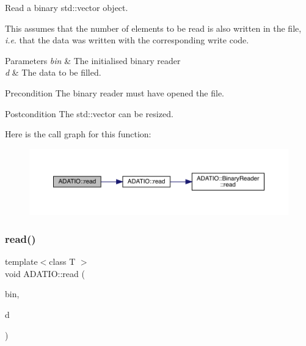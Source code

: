 Read a binary std\+::vector object. 

This assumes that the number of elements to be read is also written in the file, {\itshape i.\+e}. that the data was written with the corresponding write code. 
\begin{DoxyParams}{Parameters}
{\em bin} & The initialised binary reader \\
\hline
{\em d} & The data to be filled.\\
\hline
\end{DoxyParams}
\begin{DoxyPrecond}{Precondition}
The binary reader must have opened the file. 
\end{DoxyPrecond}
\begin{DoxyPostcond}{Postcondition}
The std\+::vector can be resized. 
\end{DoxyPostcond}
Here is the call graph for this function\+:\nopagebreak
\begin{figure}[H]
\begin{center}
\leavevmode
\includegraphics[width=350pt]{d0/dba/namespaceADATIO_a6f8814a83922a0b41bf9a25627b5dcfd_cgraph}
\end{center}
\end{figure}
\mbox{\label{namespaceADATIO_a6b74b694d784ffa233957d276d10528d}} 
\subsubsection{\texorpdfstring{read()}{read()}\hspace{0.1cm}{\footnotesize\ttfamily [25/28]}}
{\footnotesize\ttfamily template$<$class T $>$ \\
void A\+D\+A\+T\+I\+O\+::read (\begin{DoxyParamCaption}\item[{\mbox{\hyperlink{classADATIO_1_1BinaryReader}{Binary\+Reader}} \&}]{bin,  }\item[{std\+::list$<$ T $>$ \&}]{d }\end{DoxyParamCaption})\hspace{0.3cm}{\ttfamily [inline]}}



